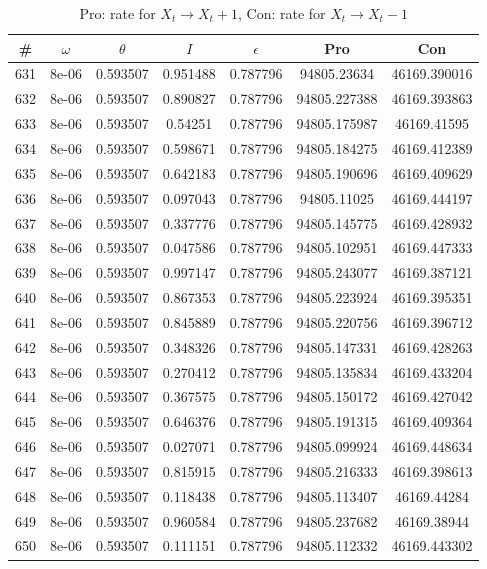 \newpage
\begin{table}
\caption{Pro: rate for $X_t \rightarrow X_t + 1$, Con: rate for $X_t \rightarrow X_t - 1$}
\begin{tabular*}{\linewidth}{c|c|c|c|c|c|c}
\# & $\omega$ & $\theta$ & $I$ & $\epsilon$ & Pro & Con \\
\hline
631 & 8e-06 & 0.593507 & 0.951488 & 0.787796 & 94805.23634 & 46169.390016\\
632 & 8e-06 & 0.593507 & 0.890827 & 0.787796 & 94805.227388 & 46169.393863\\
633 & 8e-06 & 0.593507 & 0.54251 & 0.787796 & 94805.175987 & 46169.41595\\
634 & 8e-06 & 0.593507 & 0.598671 & 0.787796 & 94805.184275 & 46169.412389\\
635 & 8e-06 & 0.593507 & 0.642183 & 0.787796 & 94805.190696 & 46169.409629\\
636 & 8e-06 & 0.593507 & 0.097043 & 0.787796 & 94805.11025 & 46169.444197\\
637 & 8e-06 & 0.593507 & 0.337776 & 0.787796 & 94805.145775 & 46169.428932\\
638 & 8e-06 & 0.593507 & 0.047586 & 0.787796 & 94805.102951 & 46169.447333\\
639 & 8e-06 & 0.593507 & 0.997147 & 0.787796 & 94805.243077 & 46169.387121\\
640 & 8e-06 & 0.593507 & 0.867353 & 0.787796 & 94805.223924 & 46169.395351\\
641 & 8e-06 & 0.593507 & 0.845889 & 0.787796 & 94805.220756 & 46169.396712\\
642 & 8e-06 & 0.593507 & 0.348326 & 0.787796 & 94805.147331 & 46169.428263\\
643 & 8e-06 & 0.593507 & 0.270412 & 0.787796 & 94805.135834 & 46169.433204\\
644 & 8e-06 & 0.593507 & 0.367575 & 0.787796 & 94805.150172 & 46169.427042\\
645 & 8e-06 & 0.593507 & 0.646376 & 0.787796 & 94805.191315 & 46169.409364\\
646 & 8e-06 & 0.593507 & 0.027071 & 0.787796 & 94805.099924 & 46169.448634\\
647 & 8e-06 & 0.593507 & 0.815915 & 0.787796 & 94805.216333 & 46169.398613\\
648 & 8e-06 & 0.593507 & 0.118438 & 0.787796 & 94805.113407 & 46169.44284\\
649 & 8e-06 & 0.593507 & 0.960584 & 0.787796 & 94805.237682 & 46169.38944\\
650 & 8e-06 & 0.593507 & 0.111151 & 0.787796 & 94805.112332 & 46169.443302\\

\end{tabular*}
\end{table}
